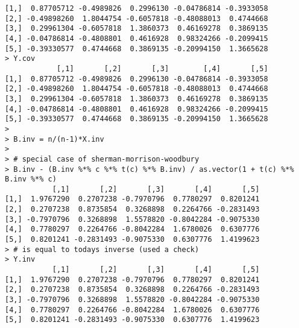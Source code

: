 \documentclass[10pt]{article}
\begin{document}
\begin{verbatim}
[1,]  0.87705712 -0.4989826  0.2996130 -0.04786814 -0.3933058
[2,] -0.49898260  1.8044754 -0.6057818 -0.48088013  0.4744668
[3,]  0.29961304 -0.6057818  1.3860373  0.46169278  0.3869135
[4,] -0.04786814 -0.4808801  0.4616928  0.98324266 -0.2099415
[5,] -0.39330577  0.4744668  0.3869135 -0.20994150  1.3665628
> Y.cov
            [,1]       [,2]       [,3]        [,4]       [,5]
[1,]  0.87705712 -0.4989826  0.2996130 -0.04786814 -0.3933058
[2,] -0.49898260  1.8044754 -0.6057818 -0.48088013  0.4744668
[3,]  0.29961304 -0.6057818  1.3860373  0.46169278  0.3869135
[4,] -0.04786814 -0.4808801  0.4616928  0.98324266 -0.2099415
[5,] -0.39330577  0.4744668  0.3869135 -0.20994150  1.3665628
> 
> B.inv = n/(n-1)*X.inv
> 
> # special case of sherman-morrison-woodbury
> B.inv - (B.inv %*% c %*% t(c) %*% B.inv) / as.vector(1 + t(c) %*% B.inv %*% c)
           [,1]       [,2]       [,3]       [,4]       [,5]
[1,]  1.9767290  0.2707238 -0.7970796  0.7780297  0.8201241
[2,]  0.2707238  0.8735854  0.3268898  0.2264766 -0.2831493
[3,] -0.7970796  0.3268898  1.5578820 -0.8042284 -0.9075330
[4,]  0.7780297  0.2264766 -0.8042284  1.6780026  0.6307776
[5,]  0.8201241 -0.2831493 -0.9075330  0.6307776  1.4199623
> # is equal to todays inverse (used a check)
> Y.inv
           [,1]       [,2]       [,3]       [,4]       [,5]
[1,]  1.9767290  0.2707238 -0.7970796  0.7780297  0.8201241
[2,]  0.2707238  0.8735854  0.3268898  0.2264766 -0.2831493
[3,] -0.7970796  0.3268898  1.5578820 -0.8042284 -0.9075330
[4,]  0.7780297  0.2264766 -0.8042284  1.6780026  0.6307776
[5,]  0.8201241 -0.2831493 -0.9075330  0.6307776  1.4199623
\end{verbatim}
\end{document}
